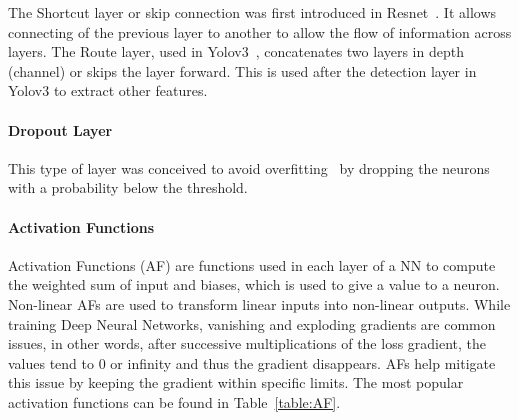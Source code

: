\documentclass[conference]{IEEEtran}
\begin{document}
The Shortcut layer or skip connection was first introduced in
Resnet~\cite{resnet}.  It allows connecting of the previous layer to another to
allow the flow of information across layers.  The Route layer, used in
Yolov3~\cite{yolov3}, concatenates two layers in depth (channel) or skips the
layer forward. This is used after the detection layer in Yolov3 to extract other
features.

\paragraph{Dropout Layer}

This type of layer was conceived to avoid overfitting~\cite{Dropout} by dropping
the neurons with a probability below the threshold. 

\paragraph{Activation Functions}

Activation Functions (AF) are functions used in each layer of a NN
to compute the weighted sum of input and biases, which is used to give a value
to a neuron. Non-linear AFs are used to transform linear inputs into non-linear
outputs.  While training Deep Neural Networks, vanishing and exploding
gradients are common issues, in other words, after successive multiplications
of the loss gradient, the values tend to 0 or infinity and thus the
gradient disappears. AFs help mitigate this issue by keeping the gradient within
specific limits. The most popular activation functions can be found in
Table~\ref{table:AF}.
\end{document}
